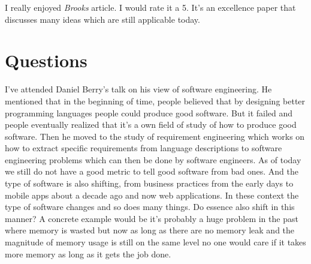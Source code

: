 \documentclass[sigconf]{acmart}
\begin{document}
I really enjoyed {\it Brooks} article. I would rate it a 5. It's an excellence paper that discusses many ideas which are still applicable today. 

\section{Questions}
I've attended Daniel Berry's talk on his view of software engineering. He mentioned that in the beginning of time, people believed that by designing better programming languages people could produce good software. But it failed and people eventually realized that it's a own field of study of how to produce good software. Then he moved to the study of requirement engineering which works on how to extract specific requirements from language descriptions to software engineering problems which can then be done by software engineers. As of today we still do not have a good metric to tell good software from bad ones. And the type of software is also shifting, from business practices from the early days to mobile apps about a decade ago and now web applications. In these context the type of software changes and so does many things. Do essence also shift in this manner? A concrete example would be it's probably a huge problem in the past where memory is wasted but now as long as there are no memory leak and the magnitude of memory usage is still on the same level no one would care if it takes more memory as long as it gets the job done.

\end{document}
